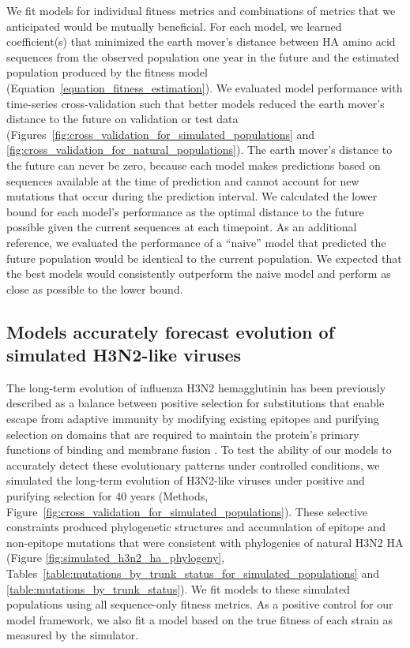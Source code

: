We fit models for individual fitness metrics and combinations of metrics that we anticipated would be mutually beneficial.
For each model, we learned coefficient(s) that minimized the earth mover's distance between HA amino acid sequences from the observed population one year in the future and the estimated population produced by the fitness model (Equation~\ref{equation_fitness_estimation}).
We evaluated model performance with time-series cross-validation such that better models reduced the earth mover's distance to the future on validation or test data (Figures~\ref{fig:cross_validation_for_simulated_populations} and \ref{fig:cross_validation_for_natural_populations}).
The earth mover's distance to the future can never be zero, because each model makes predictions based on sequences available at the time of prediction and cannot account for new mutations that occur during the prediction interval.
We calculated the lower bound for each model's performance as the optimal distance to the future possible given the current sequences at each timepoint.
As an additional reference, we evaluated the performance of a ``naive'' model that predicted the future population would be identical to the current population.
We expected that the best models would consistently outperform the naive model and perform as close as possible to the lower bound.

\subsection{Models accurately forecast evolution of simulated H3N2-like viruses}

The long-term evolution of influenza H3N2 hemagglutinin has been previously described as a balance between positive selection for substitutions that enable escape from adaptive immunity by modifying existing epitopes and purifying selection on domains that are required to maintain the protein's primary functions of binding and membrane fusion \citep{Bush:1999vj,Neher2013,Luksza:2014hj,Koelle:2015dh}.
To test the ability of our models to accurately detect these evolutionary patterns under controlled conditions, we simulated the long-term evolution of H3N2-like viruses under positive and purifying selection for 40 years (Methods, Figure~\ref{fig:cross_validation_for_simulated_populations}).
These selective constraints produced phylogenetic structures and accumulation of epitope and non-epitope mutations that were consistent with phylogenies of natural H3N2 HA (Figure \ref{fig:simulated_h3n2_ha_phylogeny}, Tables~\ref{table:mutations_by_trunk_status_for_simulated_populations} and \ref{table:mutations_by_trunk_status}).
We fit models to these simulated populations using all sequence-only fitness metrics.
As a positive control for our model framework, we also fit a model based on the true fitness of each strain as measured by the simulator.

